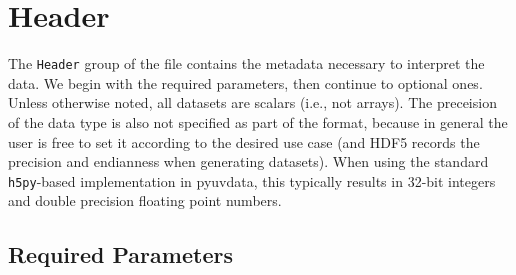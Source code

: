 \documentclass[11pt, oneside]{article}
\begin{document}
\section{Header}
The \verb+Header+ group of the file contains the metadata necessary to interpret
the data. We begin with the required parameters, then continue to optional
ones. Unless otherwise noted, all datasets are scalars (i.e., not arrays). The
preceision of the data type is also not specified as part of the format, because
in general the user is free to set it according to the desired use case (and
HDF5 records the precision and endianness when generating datasets). When using
the standard \verb+h5py+-based implementation in pyuvdata, this typically
results in 32-bit integers and double precision floating point numbers.

\subsection{Required Parameters}
\end{document}
